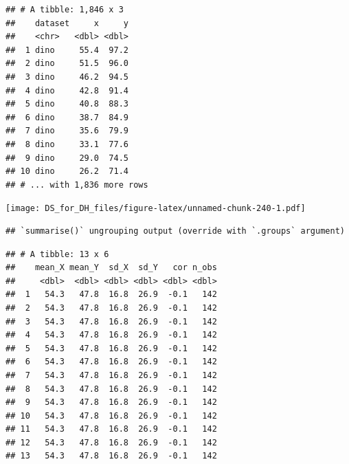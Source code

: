 \documentclass[
]{book}
\newenvironment{Shaded}{\begin{snugshade}}{\end{snugshade}}
\newcommand{\DataTypeTok}[1]{\textcolor[rgb]{0.13,0.29,0.53}{#1}}
\newcommand{\DecValTok}[1]{\textcolor[rgb]{0.00,0.00,0.81}{#1}}
\newcommand{\KeywordTok}[1]{\textcolor[rgb]{0.13,0.29,0.53}{\textbf{#1}}}
\newcommand{\NormalTok}[1]{#1}
\newcommand{\OperatorTok}[1]{\textcolor[rgb]{0.81,0.36,0.00}{\textbf{#1}}}
\newcommand{\StringTok}[1]{\textcolor[rgb]{0.31,0.60,0.02}{#1}}
\begin{document}
\begin{verbatim}
## # A tibble: 1,846 x 3
##    dataset     x     y
##    <chr>   <dbl> <dbl>
##  1 dino     55.4  97.2
##  2 dino     51.5  96.0
##  3 dino     46.2  94.5
##  4 dino     42.8  91.4
##  5 dino     40.8  88.3
##  6 dino     38.7  84.9
##  7 dino     35.6  79.9
##  8 dino     33.1  77.6
##  9 dino     29.0  74.5
## 10 dino     26.2  71.4
## # ... with 1,836 more rows
\end{verbatim}

\texttt{[image: DS\_for\_DH\_files/figure-latex/unnamed-chunk-240-1.pdf]}

\begin{Shaded}
\end{Shaded}

\begin{verbatim}
## `summarise()` ungrouping output (override with `.groups` argument)
\end{verbatim}

\begin{verbatim}
## # A tibble: 13 x 6
##    mean_X mean_Y  sd_X  sd_Y   cor n_obs
##     <dbl>  <dbl> <dbl> <dbl> <dbl> <dbl>
##  1   54.3   47.8  16.8  26.9  -0.1   142
##  2   54.3   47.8  16.8  26.9  -0.1   142
##  3   54.3   47.8  16.8  26.9  -0.1   142
##  4   54.3   47.8  16.8  26.9  -0.1   142
##  5   54.3   47.8  16.8  26.9  -0.1   142
##  6   54.3   47.8  16.8  26.9  -0.1   142
##  7   54.3   47.8  16.8  26.9  -0.1   142
##  8   54.3   47.8  16.8  26.9  -0.1   142
##  9   54.3   47.8  16.8  26.9  -0.1   142
## 10   54.3   47.8  16.8  26.9  -0.1   142
## 11   54.3   47.8  16.8  26.9  -0.1   142
## 12   54.3   47.8  16.8  26.9  -0.1   142
## 13   54.3   47.8  16.8  26.9  -0.1   142
\end{verbatim}
\end{document}
